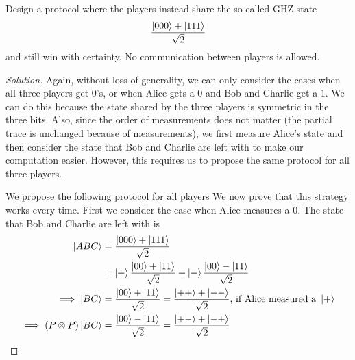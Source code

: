 \begin{solution}[label=ques:3c]
  \begin{question}
    Design a protocol where the players instead share the so-called GHZ state
\[
\frac{\ket{000} + \ket{111}}{\sqrt{2}}
\]
and still win with certainty. No communication between players is allowed.
  \end{question}
  \tcblower{}
  \begin{proof}[Solution]
    Again, without loss of generality, we can only consider the cases when all three players get $0$'s, or when Alice gets a $0$ and Bob and Charlie get a $1$. We can do this because the state shared by the three players is symmetric in the three bits. Also, since the order of measurements does not matter (the partial trace is unchanged because of measurements), we first measure Alice's state and then consider the state that Bob and Charlie are left with to make our computation easier. However, this requires us to propose the same protocol for all three players.\par
    We propose the following protocol for all players
    We now prove that this strategy works every time. First we consider the case when Alice measures a $0$. The state that Bob and Charlie are left with is
    \begin{equation}
      \begin{split}
        \ket{ABC} &= \frac{\ket{000} + \ket{111}}{\sqrt{2}}\\
        &= \ket{+}\frac{\ket{00} + \ket{11}}{\sqrt{2}} + \ket{-}\frac{\ket{00} - \ket{11}}{\sqrt{2}}\\
        \implies \ket{BC} &= \frac{\ket{00} + \ket{11}}{\sqrt{2}} = \frac{\ket{++} + \ket{--}}{\sqrt{2}}\text{, if Alice measured a }\ket{+}\\
        \implies (P\otimes P)\ket{BC} &= \frac{\ket{00} - \ket{11}}{\sqrt{2}} = \frac{\ket{+-} + \ket{-+}}{\sqrt{2}}
      \end{split}

\end{equation}
\end{proof}
\end{solution}
